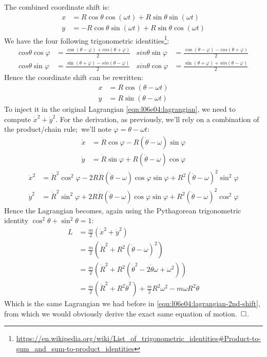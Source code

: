 \documentclass[solutions.tex]{subfiles}
\begin{document}
The combined coordinate shift is:
\begin{align*}
	x &= R\cos\theta\cos(\omega t) + R\sin\theta\sin(\omega t)\\
	y &= -R\cos\theta\sin(\omega t) + R\sin\theta\cos(\omega t)
\end{align*}
We have the four following trigonometric identities\footnote{
\url{https://en.wikipedia.org/wiki/List\_of\_trigonometric\_identities\#Product-to-sum\_and\_sum-to-product\_identities}}:
\begin{align*}
	cos\theta\cos\varphi &= \frac{\cos(\theta-\varphi)+cos(\theta+\varphi)}{2}
	& sin\theta\sin\varphi &= \frac{\cos(\theta-\varphi)-cos(\theta+\varphi)}{2}\\
	cos\theta\sin\varphi &= \frac{\sin(\theta+\varphi)-sin(\theta-\varphi)}{2}
	& sin\theta\cos\varphi &= \frac{\sin(\theta+\varphi)+sin(\theta-\varphi)}{2}
\end{align*}
Hence the coordinate shift can be rewritten:
\begin{align}
	x &= R\cos(\theta-\omega t)\nonumber\\
	y &= R\sin(\theta-\omega t)
	\label{eqn:l06e04:combined-shift}
\end{align}
To inject it in the original Lagrangian \eqref{eqn:l06e04:lagrangian},
we need to compute $\dot{x}^2+\dot{y}^2$. For the derivation, as previously,
we'll rely on a combination of the product/chain rule; we'll note
$\varphi=\theta-\omega t$:
\begin{align*}
	\dot{x} &= \dot{R}\cos\varphi - R(\dot\theta-\omega)\sin\varphi \\
	\dot{y} &= \dot{R}\sin\varphi + R(\dot\theta-\omega)\cos\varphi
\end{align*}
\begin{align*}
	\dot{x}^2 &= \dot{R}^2\cos^2\varphi
		- 2R\dot{R}(\dot\theta-\omega)\cos\varphi\sin\varphi
		+ R^2(\dot\theta-\omega)^2\sin^2\varphi \\
	\dot{y}^2 &= \dot{R}^2\sin^2\varphi
		+ 2R\dot{R}(\dot\theta-\omega)\cos\varphi\sin\varphi
		+R^2(\dot\theta-\omega)^2\cos^2\varphi
\end{align*}
Hence the Lagrangian becomes, again using the Pythagorean trigonometric
identity $\cos^2\theta+\sin^2\theta = 1$:
\begin{align*}
	L &= \frac{m}{2}\left(\dot{x}^2+\dot{y}^2\right) \\
	~ &= \boxed{\frac{m}{2}\left(\dot{R}^2+R^2(\dot\theta-\omega)^2\right)} \\
	~ &= \frac{m}{2}\left(\dot{R}^2+R^2(\dot\theta^2-2\dot\theta\omega+\omega^2)\right) \\
	~ &= \frac{m}{2}(\dot{R}^2+R^2\dot\theta^2)+\frac{m}{2}R^2\omega^2-m\omega R^2\dot\theta
\end{align*}
Which is the same Lagrangian we had before in
\eqref{eqn:l06e04:lagrangian-2nd-shift}, from which
we would obviously derive the exact same equation of motion. $\qed$.
\end{document}
